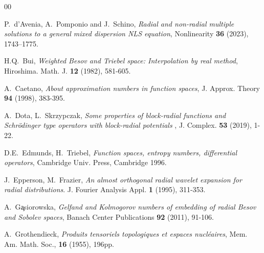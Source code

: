 \documentclass[12pt]{article}
\begin{document}


\begin{thebibliography}{00}

P.~d'Avenia, A.~Pomponio and J.~Schino, 
{\sl 
Radial and non-radial multiple solutions to
a general mixed dispersion NLS equation}, Nonlinearity {\bf 36} (2023), 1743–1775.



  H.Q.~Bui, {\sl Weighted Besov and Triebel space: Interpolation by real method}, Hiroshima.  Math. J.  {\bf12} (1982), 581-605.

{ A.~Caetano}, {\sl About approximation numbers in function spaces}, 
J. Approx. Theory \textbf{94} (1998), 383-395.


A.~Dota, L.~Skrzypczak, {\sl Some properties of block-radial functions and Schr\"{o}dinger type operators with block-radial potentials
}, J. Complex. {\bf 53} (2019), 1-22.


D.E.~Edmunds, H.~Triebel, {\sl Function spaces, entropy
	numbers, differential operators}, Cambridge Univ. Press,
Cambridge 1996. 

J.~Epperson, M.~Frazier, {\sl  An almost orthogonal radial
wavelet expansion for radial distributions}. J. Fourier Analysis
Appl. {\bf 1} (1995), 311-353.


A.~G\c{a}siorowska, {\sl Gelfand and Kolmogorov numbers of embedding of radial Besov and Sobolev spaces}, Banach Center Publications {\bf 92} (2011), 91-106.

 A.~Grothendieck, {\sl Produits tensoriels topologiques et espaces nucléaires}, Mem. Am. Math. Soc., {\bf16} (1955), 196pp.



\end{thebibliography}
\end{document}
